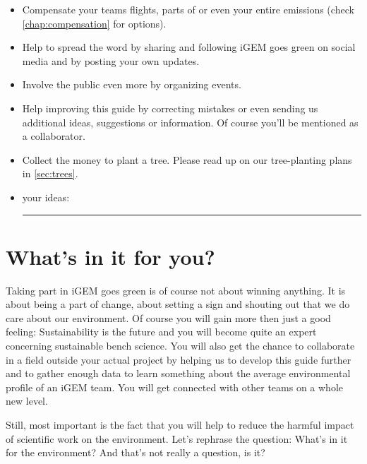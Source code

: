 {\begin{checklistbox}
\begin{itemize}
	\item Compensate your teams flights, parts of or even your entire emissions (check \cref{chap:compensation} for options).
	\item Help to spread the word by sharing and following iGEM goes green on social media and by posting your own updates.
	\item Involve the public even more by organizing events.
	\item Help improving this guide by correcting mistakes or even sending us additional ideas, suggestions or information. Of course you'll be mentioned as a collaborator.
	\item Collect the money to plant a tree. Please read up on our tree-planting plans in \cref{sec:trees}.
	\item your ideas: {\leavevmode\leaders\hrule  height -1.9pt depth 2pt \hfill\kern0pt\relax}
\end{itemize}
\end{checklistbox}
}

\section{What's in it for you?}

Taking part in iGEM goes green is of course not about winning anything. It is about being a part of change, about setting a sign and shouting out that we do care about our environment. Of course you will gain more then just a good feeling: Sustainability is the future and you will become quite an expert concerning sustainable bench science. You will also get the chance to collaborate in a field outside your actual project by helping us to develop this guide further and to gather enough data to learn something about the average environmental profile of an iGEM team. You will get connected with other teams on a whole new level.

Still, most important is the fact that you will help to reduce the harmful impact of scientific work on the environment. Let's rephrase the question: What's in it for the environment? And that's not really a question, is it?
